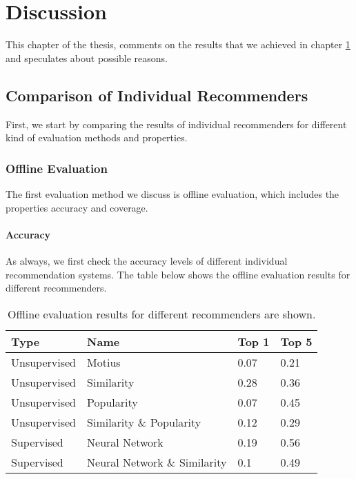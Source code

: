 
\chapter{Discussion}\label{chapter:discussion}

This chapter of the thesis, comments on the results that we achieved in chapter \ref{chapter:discussion} and speculates about possible reasons.

\section{Comparison of Individual Recommenders}

First, we start by comparing the results of individual recommenders for different kind of evaluation methods and properties.

\subsection{Offline Evaluation}

The first evaluation method we discuss is offline evaluation, which includes the properties accuracy and coverage.

\subsubsection{Accuracy}\label{discussion:single-offline-accuracy}

As always, we first check the accuracy levels of different individual recommendation systems. The table below shows the offline evaluation results for different recommenders.

\begin{table}[htp]
	\caption[Offline evaluation results]{Offline evaluation results for different recommenders are shown.}
	\centering
	\begin{tabular}{|l|l|l|l|}
		\hline
		Type         & Name           & Top 1 & Top 5 \\ \hline
		Unsupervised & Motius         & 0.07  & 0.21  \\ \hline
		Unsupervised & Similarity     & 0.28  & 0.36  \\ \hline
		Unsupervised & Popularity     & 0.07  & 0.45  \\ \hline
		Unsupervised & Similarity \& Popularity         & 0.12  & 0.29  \\ \hline
		Supervised   & Neural Network & 0.19  & 0.56  \\ \hline
		Supervised   & Neural Network \& Similarity & 0.1  & 0.49  \\ \hline
	\end{tabular}
	\label{discussion:accuracy-offline}
\end{table}

